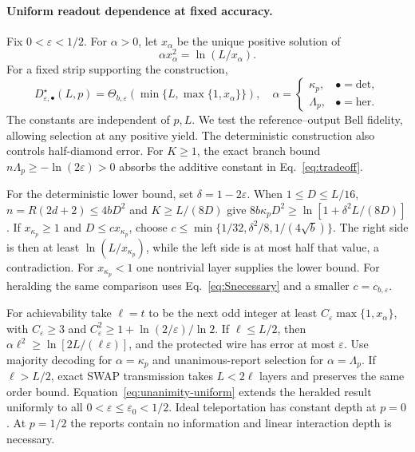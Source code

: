 \documentclass[aps,prl,twocolumn,superscriptaddress,longbibliography,reprint,floatfix]{revtex4-2}
\newcommand{\eps}{\varepsilon}
\begin{document}
\paragraph*{Uniform readout dependence at fixed accuracy.}
Fix $0<\eps<1/2$. For $\alpha>0$, let
$x_\alpha$ be the unique positive solution of
\begin{equation}
 \alpha x_\alpha^2=\ln(L/x_\alpha).
 \label{eq:information-scale}
\end{equation}
For a fixed strip supporting the construction,
\begin{equation}
 D_{\eps,\bullet}^{\star}(L,p)
 =\Theta_{b,\eps}\!\left(\min\{L,\max\{1,x_\alpha\}\}\right),
 \quad
 \alpha=
 \begin{cases}
 \kappa_p,&\bullet=\mathrm{det},\\
 \Lambda_p,&\bullet=\mathrm{her}.
 \end{cases}
 \label{eq:uniform-information-time}
\end{equation}
The constants are independent of $p,L$. We test the reference--output Bell fidelity, allowing selection at any positive yield. The deterministic construction also controls half-diamond error.
For $K\ge1$, the exact branch bound $n\Lambda_p\ge-\ln(2\eps)>0$ absorbs the additive constant in Eq.~\eqref{eq:tradeoff}.

For the deterministic lower bound, set $\delta=1-2\eps$.
When $1\le D\le L/16$, $n=R(2d+2)\le4bD^2$ and
$K\ge L/(8D)$ give
$8b\kappa_pD^2\ge\ln[1+\delta^2L/(8D)]$.
If $x_{\kappa_p}\ge1$ and
$D\le c x_{\kappa_p}$, choose
$c\le\min\{1/32,\delta^2/8,1/(4\sqrt b)\}$.
The right side is then at least $\ln(L/x_{\kappa_p})$,
while the left side is at most half that value, a contradiction.
For $x_{\kappa_p}<1$ one nontrivial layer supplies the lower bound.
For heralding the same comparison uses Eq.~\eqref{eq:Snecessary} and a smaller $c=c_{b,\eps}$.

For achievability take $\ell=t$ to be the next odd integer at least
$C_\eps\max\{1,x_\alpha\}$, with
$C_\eps\ge3$ and
$C_\eps^2\ge1+\ln(2/\eps)/\ln2$.
If $\ell\le L/2$, then
$\alpha\ell^2\ge\ln[2L/(\ell\eps)]$, and the protected wire
has error at most $\eps$. Use majority decoding for
$\alpha=\kappa_p$ and unanimous-report selection for
$\alpha=\Lambda_p$. If $\ell>L/2$, exact SWAP transmission takes
$L<2\ell$ layers and preserves the same order bound.
Equation~\eqref{eq:unanimity-uniform} extends the heralded result uniformly to all $0<\eps\le\eps_0<1/2$.
Ideal teleportation has constant depth at $p=0$. At $p=1/2$ the
reports contain no information and linear interaction depth is necessary.
\end{document}
